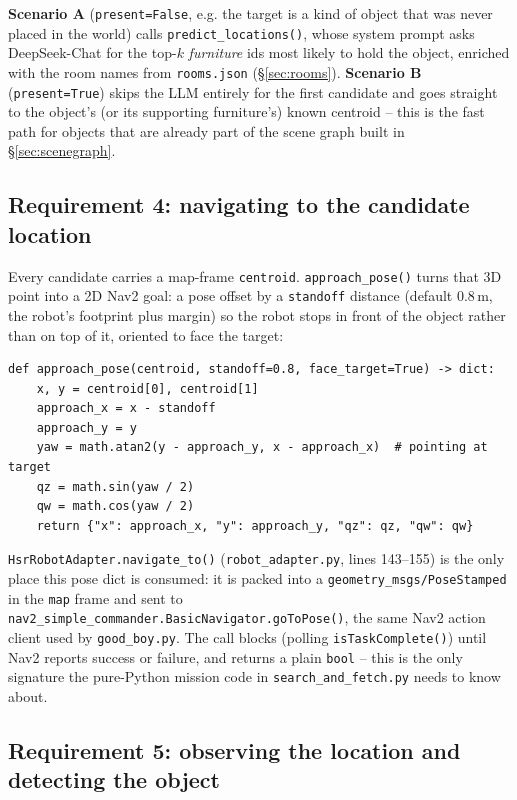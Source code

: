 \documentclass[11pt]{article}
\begin{document}
\textbf{Scenario A} (\texttt{present=False}, e.g. the target is a kind of
object that was never placed in the world) calls
\texttt{predict\_locations()}, whose system prompt asks DeepSeek-Chat for the
top-$k$ \emph{furniture} ids most likely to hold the object, enriched with the
room names from \texttt{rooms.json} (\S\ref{sec:rooms}). \textbf{Scenario B}
(\texttt{present=True}) skips the LLM entirely for the first candidate and
goes straight to the object's (or its supporting furniture's) known centroid
-- this is the fast path for objects that are already part of the scene
graph built in \S\ref{sec:scenegraph}.

\subsection{Requirement 4: navigating to the candidate location}
\label{sec:navigate}

Every candidate carries a map-frame \texttt{centroid}. \texttt{approach\_pose()}
turns that 3D point into a 2D Nav2 goal: a pose offset by a \texttt{standoff}
distance (default $0.8\,$m, the robot's footprint plus margin) so the robot
stops in front of the object rather than on top of it, oriented to face the
target:

\begin{lstlisting}[caption={\texttt{active\_perception.py}: \texttt{approach\_pose()} (lines 22--41)}]
def approach_pose(centroid, standoff=0.8, face_target=True) -> dict:
    x, y = centroid[0], centroid[1]
    approach_x = x - standoff
    approach_y = y
    yaw = math.atan2(y - approach_y, x - approach_x)  # pointing at target
    qz = math.sin(yaw / 2)
    qw = math.cos(yaw / 2)
    return {"x": approach_x, "y": approach_y, "qz": qz, "qw": qw}
\end{lstlisting}

\texttt{HsrRobotAdapter.navigate\_to()} (\texttt{robot\_adapter.py}, lines
143--155) is the only place this pose dict is consumed: it is packed into a
\texttt{geometry\_msgs/PoseStamped} in the \texttt{map} frame and sent to
\texttt{nav2\_simple\_commander.BasicNavigator.goToPose()}, the same Nav2
action client used by \texttt{good\_boy.py}. The call blocks (polling
\texttt{isTaskComplete()}) until Nav2 reports success or failure, and returns
a plain \texttt{bool} -- this is the only signature the pure-Python mission
code in \texttt{search\_and\_fetch.py} needs to know about.

\subsection{Requirement 5: observing the location and detecting the object}
\label{sec:observe}
\end{document}
